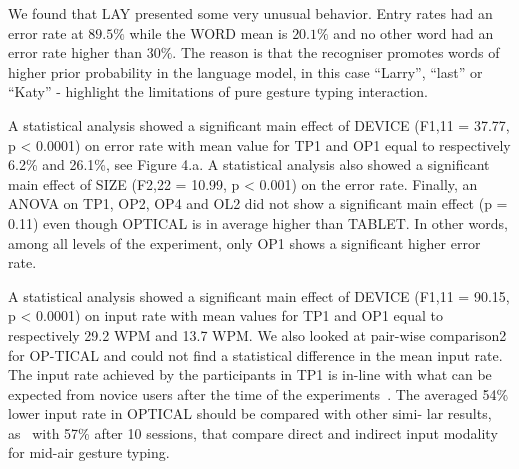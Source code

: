 \documentclass{chi-ext}
\begin{document}
We found that LAY presented some very unusual behavior. Entry rates had an error rate at $89.5\%$ while the WORD mean is $20.1\%$ and no other word had an error rate higher than $30\%$. The reason is that the recogniser promotes words of higher prior probability in the language model, in this case “Larry”, “last” or “Katy” - highlight the limitations of pure gesture typing interaction.

A statistical analysis showed a significant main effect of DEVICE (F1,11 = 37.77, p < 0.0001) on error rate with mean value for TP1 and OP1 equal to respectively 6.2\% and 26.1\%, see Figure 4.a. A statistical analysis also showed a significant main effect of SIZE (F2,22 = 10.99, p < 0.001) on the error rate. Finally, an ANOVA on TP1, OP2, OP4 and OL2 did not show a significant main effect (p = 0.11) even though OPTICAL is in average higher than TABLET. In other words, among all levels of the experiment, only OP1 shows a significant higher error rate.

A statistical analysis showed a significant main effect of DEVICE (F1,11 = 90.15, p < 0.0001) on input rate with mean values for TP1 and OP1 equal to respectively 29.2 WPM and 13.7 WPM. We also looked at pair-wise comparison2 for OP-TICAL and could not find a statistical difference in the mean input rate. The input rate achieved by the participants in TP1 is in-line with what can be expected from novice users after the time of the experiments~\cite{Kristensson2004}. The averaged 54\% lower input rate in OPTICAL should be compared with other simi- lar results, as~\cite{Markussen2014} with 57\% after 10 sessions, that compare direct and indirect input modality for mid-air gesture typing.
\end{document}
